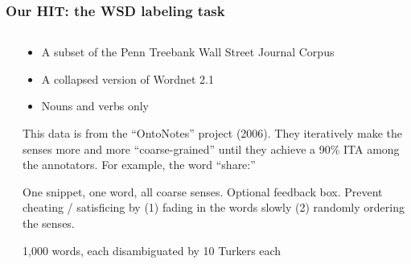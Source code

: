 \documentclass[slides]{beamer} %
\begin{document}
\begin{frame}\frametitle{Our HIT: the WSD labeling task}

\begin{columns}
\begin{column}{.5\textwidth}
\centering
{}
\end{column}
\begin{column}{.5\textwidth}
\scriptsize
\begin{itemize}
\scriptsize
\item A subset of the Penn Treebank Wall Street Journal Corpus
\item A collapsed version of Wordnet 2.1
\item Nouns and verbs only
\end{itemize}

\vspace{0.2cm}

This data is from the ``OntoNotes'' project (2006). They iteratively make the senses more and more ``coarse-grained'' until they achieve a 90\% ITA among the annotators. For example, the word ``share:'' \\

\vspace{0.2cm}

One snippet, one word, all coarse senses. Optional feedback box. Prevent cheating / satisficing by (1) fading in the words slowly (2) randomly ordering the senses.

\vspace{0.2cm}

1,000 words, each disambiguated by 10 Turkers each

\end{column}
\end{columns}

\end{frame}
\end{document}
